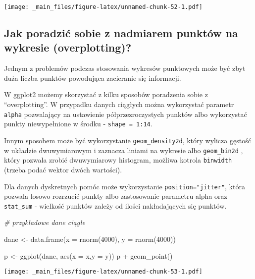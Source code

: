 \documentclass[
]{book}
\newenvironment{Shaded}{\begin{snugshade}}{\end{snugshade}}
\newcommand{\AttributeTok}[1]{\textcolor[rgb]{0.77,0.63,0.00}{#1}}
\newcommand{\CommentTok}[1]{\textcolor[rgb]{0.56,0.35,0.01}{\textit{#1}}}
\newcommand{\DecValTok}[1]{\textcolor[rgb]{0.00,0.00,0.81}{#1}}
\newcommand{\FunctionTok}[1]{\textcolor[rgb]{0.00,0.00,0.00}{#1}}
\newcommand{\NormalTok}[1]{#1}
\newcommand{\OtherTok}[1]{\textcolor[rgb]{0.56,0.35,0.01}{#1}}
\newcommand{\SpecialCharTok}[1]{\textcolor[rgb]{0.00,0.00,0.00}{#1}}
\begin{document}
\texttt{[image: \_main\_files/figure-latex/unnamed-chunk-52-1.pdf]}

\hypertarget{jak-poradziux107-sobie-z-nadmiarem-punktuxf3w-na-wykresie-overplotting}{%
\subsection{Jak poradzić sobie z nadmiarem punktów na wykresie (overplotting)?}\label{jak-poradziux107-sobie-z-nadmiarem-punktuxf3w-na-wykresie-overplotting}}

Jednym z problemów podczas stosowania wykresów punktowych może być zbyt duża liczba punktów powodująca zacieranie się informacji.

W ggplot2 możemy skorzystać z kilku sposobów poradzenia sobie z ``overplotting''. W przypadku danych ciągłych można wykorzystać parametr \texttt{alpha} pozwalający na ustawienie półprzezroczystych punktów albo wykorzystać punkty niewypełnione w środku - \texttt{shape\ =\ 1:14}.

Innym sposobem może być wykorzystanie \texttt{geom\_density2d}, który wylicza gęstość w układzie dwuwymiarowym i zaznacza liniami na wykresie albo \texttt{geom\_bin2d} , który pozwala zrobić dwuwymiarowy histogram, możliwa kotrola \texttt{binwidth} (trzeba podać wektor dwóch wartości).

Dla danych dyskretnych pomóc może wykorzystanie \texttt{position="jitter"}, która pozwala losowo rozrzucić punkty albo zastosowanie parametru alpha oraz \texttt{stat\_sum} - wielkość punktów zależy od ilości nakładających się punktów.

\begin{Shaded}
\begin{Highlighting}[]
\CommentTok{\# przykładowe dane ciągłe}

\NormalTok{dane }\OtherTok{\textless{}{-}} \FunctionTok{data.frame}\NormalTok{(}\AttributeTok{x =} \FunctionTok{rnorm}\NormalTok{(}\DecValTok{4000}\NormalTok{), }\AttributeTok{y =} \FunctionTok{rnorm}\NormalTok{(}\DecValTok{4000}\NormalTok{))}

\NormalTok{p }\OtherTok{\textless{}{-}} \FunctionTok{ggplot}\NormalTok{(dane, }\FunctionTok{aes}\NormalTok{(}\AttributeTok{x =}\NormalTok{ x,}\AttributeTok{y =}\NormalTok{ y))}
\NormalTok{p }\SpecialCharTok{+} \FunctionTok{geom\_point}\NormalTok{()}
\end{Highlighting}
\end{Shaded}

\texttt{[image: \_main\_files/figure-latex/unnamed-chunk-53-1.pdf]}
\end{document}
